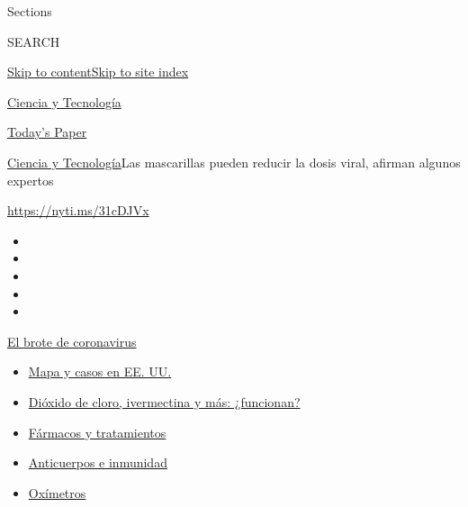 Sections

SEARCH

\protect\hyperlink{site-content}{Skip to
content}\protect\hyperlink{site-index}{Skip to site index}

\href{https://www.nytimes.com/es/section/ciencia-y-tecnologia}{Ciencia y
Tecnología}

\href{https://myaccount.nytimes.com/auth/login?response_type=cookie\&client_id=vi}{}

\href{https://www.nytimes.com/section/todayspaper}{Today's Paper}

\href{/es/section/ciencia-y-tecnologia}{Ciencia y
Tecnología}\textbar{}Las mascarillas pueden reducir la dosis viral,
afirman algunos expertos

\url{https://nyti.ms/31cDJVx}

\begin{itemize}
\item
\item
\item
\item
\item
\end{itemize}

\href{https://www.nytimes.com/es/spotlight/coronavirus?action=click\&pgtype=Article\&state=default\&region=TOP_BANNER\&context=storylines_menu}{El
brote de coronavirus}

\begin{itemize}
\tightlist
\item
  \href{https://www.nytimes.com/es/interactive/2020/espanol/mundo/coronavirus-en-estados-unidos.html?action=click\&pgtype=Article\&state=default\&region=TOP_BANNER\&context=storylines_menu}{Mapa
  y casos en EE. UU.}
\item
  \href{https://www.nytimes.com/es/2020/07/23/espanol/america-latina/bolivia-cloro-coronavirus-ivermectina.html?action=click\&pgtype=Article\&state=default\&region=TOP_BANNER\&context=storylines_menu}{Dióxido
  de cloro, ivermectina y más: ¿funcionan?}
\item
  \href{https://www.nytimes.com/es/interactive/2020/science/coronavirus-tratamientos-curas.html?action=click\&pgtype=Article\&state=default\&region=TOP_BANNER\&context=storylines_menu}{Fármacos
  y tratamientos}
\item
  \href{https://www.nytimes.com/es/2020/07/28/espanol/ciencia-y-tecnologia/anticuerpos-coronavirus-inmunidad.html?action=click\&pgtype=Article\&state=default\&region=TOP_BANNER\&context=storylines_menu}{Anticuerpos
  e inmunidad}
\item
  \href{https://www.nytimes.com/es/2020/04/29/espanol/estilos-de-vida/oximetro-para-que-sirve.html?action=click\&pgtype=Article\&state=default\&region=TOP_BANNER\&context=storylines_menu}{Oxímetros}
\end{itemize}

